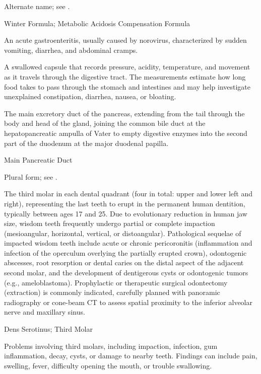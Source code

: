  Alternate name; see .

\synonyms
Winter Formula; Metabolic Acidosis Compensation Formula

 An acute gastroenteritis, usually caused by norovirus, characterized by sudden vomiting, diarrhea, and abdominal cramps.

 A swallowed capsule that records pressure, acidity, temperature, and movement as it travels through the digestive tract. The measurements estimate how long food takes to pass through the stomach and intestines and may help investigate unexplained constipation, diarrhea, nausea, or bloating.

 The main excretory duct of the pancreas, extending from the tail through the body and head of the gland, joining the common bile duct at the hepatopancreatic ampulla of Vater to empty digestive enzymes into the second part of the duodenum at the major duodenal papilla.

\synonyms
Main Pancreatic Duct

 Plural form; see .

 The third molar in each dental quadrant (four in total: upper and lower left and right), representing the last teeth to erupt in the permanent human dentition, typically between ages 17 and 25. Due to evolutionary reduction in human jaw size, wisdom teeth frequently undergo partial or complete impaction (mesioangular, horizontal, vertical, or distoangular). Pathological sequelae of impacted wisdom teeth include acute or chronic pericoronitis (inflammation and infection of the operculum overlying the partially erupted crown), odontogenic abscesses, root resorption or dental caries on the distal aspect of the adjacent second molar, and the development of dentigerous cysts or odontogenic tumors (e.g., ameloblastoma). Prophylactic or therapeutic surgical odontectomy (extraction) is commonly indicated, carefully planned with panoramic radiography or cone-beam CT to assess spatial proximity to the inferior alveolar nerve and maxillary sinus.

\synonyms
Dens Serotinus; Third Molar

 Problems involving third molars, including impaction, infection, gum inflammation, decay, cysts, or damage to nearby teeth. Findings can include pain, swelling, fever, difficulty opening the mouth, or trouble swallowing.

